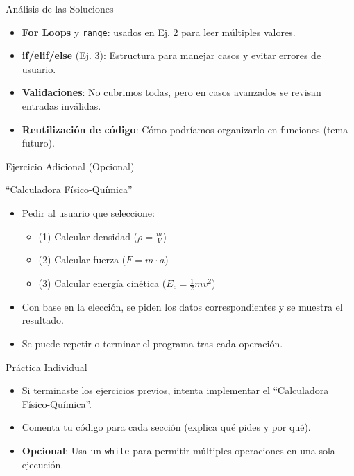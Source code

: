 \documentclass[10pt]{beamer}
\begin{document}
\begin{frame}{Análisis de las Soluciones}
  \begin{itemize}
    \item \textbf{For Loops} y \texttt{range}: usados en Ej. 2 para leer múltiples valores.
    \item \textbf{if/elif/else} (Ej. 3): Estructura para manejar casos y evitar errores de usuario.
    \item \textbf{Validaciones}: No cubrimos todas, pero en casos avanzados se revisan entradas inválidas.
    \item \textbf{Reutilización de código}: Cómo podríamos organizarlo en funciones (tema futuro).
  \end{itemize}
\end{frame}

\begin{frame}{Ejercicio Adicional (Opcional)}
  \begin{block}{“Calculadora Físico-Química”}
    \begin{itemize}
      \item Pedir al usuario que seleccione:
        \begin{itemize}
          \item (1) Calcular densidad (\(\rho = \frac{m}{V}\))
          \item (2) Calcular fuerza (\(F = m \cdot a\))
          \item (3) Calcular energía cinética (\(E_c = \frac{1}{2}mv^2\))
        \end{itemize}
      \item Con base en la elección, se piden los datos correspondientes y se muestra el resultado.
      \item Se puede repetir o terminar el programa tras cada operación.
    \end{itemize}
  \end{block}
\end{frame}

\begin{frame}{Práctica Individual}
  \begin{itemize}
    \item Si terminaste los ejercicios previos, intenta implementar el “Calculadora Físico-Química”.
    \item Comenta tu código para cada sección (explica qué pides y por qué).
    \item \textbf{Opcional}: Usa un \texttt{while} para permitir múltiples operaciones en una sola ejecución.
  \end{itemize}
\end{frame}
\end{document}
